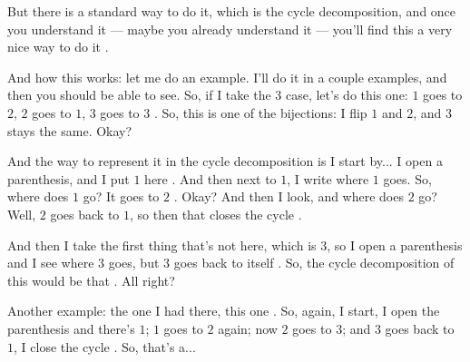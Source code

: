\begin{speech}[01:07:00 - 01:08:56]
But there is a standard way to do it, which is the cycle decomposition, and once you understand it --- maybe you already understand it --- you'll find this a very nice way to do it .

And how this works: let me do an example. I'll do it in a couple examples, and then you should be able to see. So, if I take the $3$ case, let's do this one: $1$ goes to $2$, $2$ goes to $1$, $3$ goes to $3$ . So, this is one of the bijections: I flip $1$ and $2$, and $3$ stays the same. Okay?

And the way to represent it in the cycle decomposition is I start by... I open a parenthesis, and I put $1$ here . And then next to $1$, I write where $1$ goes. So, where does $1$ go? It goes to $2$ . Okay? And then I look, and where does $2$ go? Well, $2$ goes back to $1$, so then that closes the cycle .

And then I take the first thing that's not here, which is $3$, so I open a parenthesis and I see where $3$ goes, but $3$ goes back to itself . So, the cycle decomposition of this would be that . All right?

Another example: the one I had there, this one . So, again, I start, I open the parenthesis and there's $1$; $1$ goes to $2$ again; now $2$ goes to $3$; and $3$ goes back to $1$, I close the cycle . So, that's a...
\end{speech}

